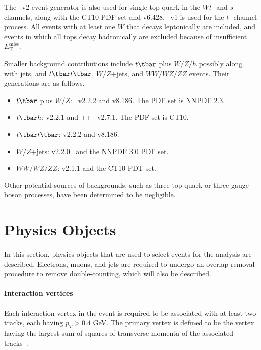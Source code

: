 The \POWHEGBOX~v2 event generator is also used for single top quark in the
$Wt$- and $s$- channels, along with the CT10 PDF set and \PYTHIA v6.428.
\POWHEGBOX~v1 is used for the $t$- channel process. All events with at least
one $W$ that decays leptonically are included, and events in which all tops
decay hadronically are excluded because of insufficient
$E_{\text{T}}^{\text{miss}}$.

Smaller background contributions include $t\tbar$ plus $W/Z/h$ possibly along
with jets, and $t\tbar t\tbar$, $W/Z$+jets, and $WW/WZ/ZZ$ events. Their
generations are as follows.

\begin{itemize}

	\item $t\tbar$ plus $W/Z$: \MGMCatNLO~v2.2.2 and \PYTHIA v8.186. The PDF set is
	      NNPDF 2.3.

	\item $t\tbar h$: \MGMCatNLO v2.2.1 and \MYHERWIG++~\cite{Bahr:2008pv} v2.7.1.
	      The PDF set is CT10.

	\item $t\tbar t\tbar$: \MGMCatNLO v2.2.2 and \PYTHIA v8.186.

	\item $W/Z$+jets: \SHERPA v2.2.0~\cite{Gleisberg:2008ta} and the NNPDF 3.0 PDF
	      set.

	\item $WW/WZ/ZZ$: \SHERPA v2.1.1 and the CT10 PDT set.
\end{itemize}

Other potential sources of backgrounds, such as three top quark or three gauge
boson processes, have been determined to be negligible.

\section{Physics Objects}\label{mbobjs}

In this section, physics objects that are used to select events for the
analysis are described. Electrons, muons, and jets are required to undergo an
overlap removal procedure to remove double-counting, which will also be
described.

\paragraph{Interaction vertices} Each interaction vertex in the event is
required to be associated with at least two tracks, each having $p_T > 0.4$
GeV. The primary vertex is defined to be the vertex having the largest sum of
squares of transverse momenta of the associated
tracks~\cite{ATL-PHYS-PUB-2015-026}.

